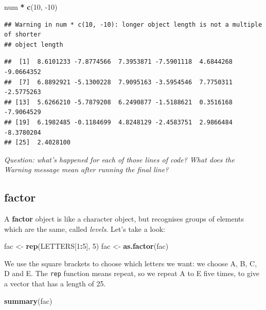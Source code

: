 \documentclass[
]{book}
\newenvironment{Shaded}{\begin{snugshade}}{\end{snugshade}}
\newcommand{\DecValTok}[1]{\textcolor[rgb]{0.00,0.00,0.81}{#1}}
\newcommand{\KeywordTok}[1]{\textcolor[rgb]{0.13,0.29,0.53}{\textbf{#1}}}
\newcommand{\NormalTok}[1]{#1}
\newcommand{\OperatorTok}[1]{\textcolor[rgb]{0.81,0.36,0.00}{\textbf{#1}}}
\newcommand{\StringTok}[1]{\textcolor[rgb]{0.31,0.60,0.02}{#1}}
\begin{document}
\begin{Shaded}
\begin{Highlighting}[]
\NormalTok{num }\OperatorTok{*}\StringTok{ }\KeywordTok{c}\NormalTok{(}\DecValTok{10}\NormalTok{, }\DecValTok{-10}\NormalTok{)}
\end{Highlighting}
\end{Shaded}

\begin{verbatim}
## Warning in num * c(10, -10): longer object length is not a multiple of shorter
## object length
\end{verbatim}

\begin{verbatim}
##  [1]  8.6101233 -7.8774566  7.3953871 -7.5901118  4.6844268 -9.0664352
##  [7]  6.8892921 -5.1300228  7.9095163 -3.5954546  7.7750311 -2.5775263
## [13]  5.6266210 -5.7879208  6.2490877 -1.5188621  0.3516168 -7.9064529
## [19]  6.1982485 -0.1184699  4.8248129 -2.4583751  2.9866484 -8.3780204
## [25]  2.4028100
\end{verbatim}

\emph{Question: what's happened for each of those lines of code? What does the Warning
message mean after running the final line?}\\
\hspace*{0.333em}

\hypertarget{factor}{%
\subsection{factor}\label{factor}}

A \textbf{factor} object is like a character object, but recognises groups of elements
which are the same, called \emph{levels}. Let's take a look:

\begin{Shaded}
\begin{Highlighting}[]
\NormalTok{fac <-}\StringTok{ }\KeywordTok{rep}\NormalTok{(LETTERS[}\DecValTok{1}\OperatorTok{:}\DecValTok{5}\NormalTok{], }\DecValTok{5}\NormalTok{)}
\NormalTok{fac <-}\StringTok{ }\KeywordTok{as.factor}\NormalTok{(fac)}
\end{Highlighting}
\end{Shaded}

We use the square brackets to choose which letters we
want: we choose A, B, C, D and E. The \texttt{rep} function means repeat, so we
repeat A to E five times, to give a vector that has a length of 25.

\begin{Shaded}
\begin{Highlighting}[]
\KeywordTok{summary}\NormalTok{(fac)}
\end{Highlighting}
\end{Shaded}
\end{document}
